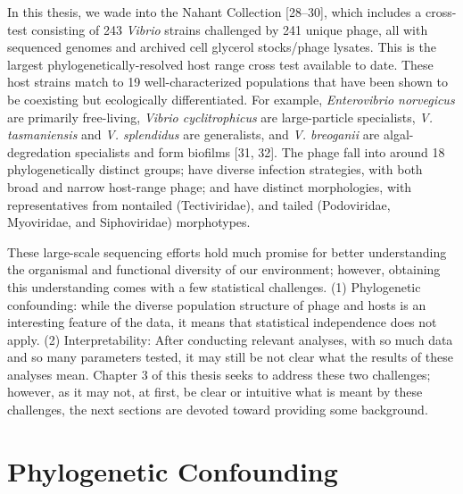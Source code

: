 \documentclass[12pt,twoside]{mitthesis-manusdown}
\begin{document}
In this thesis, we wade into the Nahant Collection {[}28--30{]}, which
includes a cross-test consisting of 243 \emph{Vibrio} strains challenged
by 241 unique phage, all with sequenced genomes and archived cell
glycerol stocks/phage lysates. This is the largest
phylogenetically-resolved host range cross test available to date. These
host strains match to 19 well-characterized populations that have been
shown to be coexisting but ecologically differentiated. For example,
\emph{Enterovibrio norvegicus} are primarily free-living, \emph{Vibrio
cyclitrophicus} are large-particle specialists, \emph{V. tasmaniensis}
and \emph{V. splendidus} are generalists, and \emph{V. breoganii} are
algal-degredation specialists and form biofilms {[}31, 32{]}. The phage
fall into around 18 phylogenetically distinct groups; have diverse
infection strategies, with both broad and narrow host-range phage; and
have distinct morphologies, with representatives from nontailed
(Tectiviridae), and tailed (Podoviridae, Myoviridae, and Siphoviridae)
morphotypes.

These large-scale sequencing efforts hold much promise for better
understanding the organismal and functional diversity of our
environment; however, obtaining this understanding comes with a few
statistical challenges. (1) Phylogenetic confounding: while the diverse
population structure of phage and hosts is an interesting feature of the
data, it means that statistical independence does not apply. (2)
Interpretability: After conducting relevant analyses, with so much data
and so many parameters tested, it may still be not clear what the
results of these analyses mean. Chapter 3 of this thesis seeks to
address these two challenges; however, as it may not, at first, be clear
or intuitive what is meant by these challenges, the next sections are
devoted toward providing some background.

\section{Phylogenetic Confounding}\label{phylogenetic-confounding}
\end{document}
